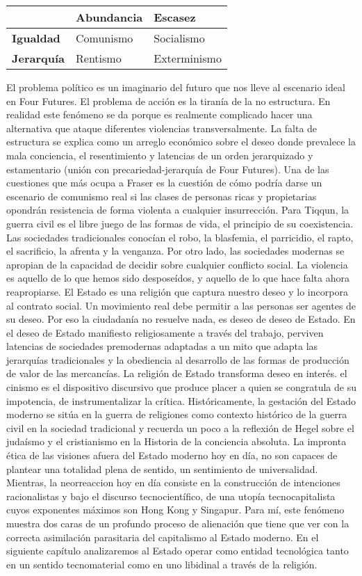 \documentclass[
]{article}
\begin{document}
\begin{longtable}[]{@{}lll@{}}
\toprule
& \textbf{Abundancia} & \textbf{Escasez}\tabularnewline
\midrule
\endhead
\textbf{Igualdad} & Comunismo & Socialismo\tabularnewline
\textbf{Jerarquía} & Rentismo & Exterminismo\tabularnewline
\bottomrule
\end{longtable}

El problema político es un imaginario del futuro que nos lleve al
escenario ideal en Four Futures. El problema de acción es la tiranía de
la no estructura. En realidad este fenómeno se da porque es realmente
complicado hacer una alternativa que ataque diferentes violencias
transversalmente. La falta de estructura se explica como un arreglo
económico sobre el deseo donde prevalece la mala conciencia, el
resentimiento y latencias de un orden jerarquizado y estamentario (unión
con precariedad-jerarquía de Four Futures). Una de las cuestiones que
más ocupa a Fraser es la cuestión de cómo podría darse un escenario de
comunismo real si las clases de personas ricas y propietarias opondrán
resistencia de forma violenta a cualquier insurrección. Para Tiqqun, la
guerra civil es el libre juego de las formas de vida, el principio de su
coexistencia. Las sociedades tradicionales conocían el robo, la
blasfemia, el parricidio, el rapto, el sacrificio, la afrenta y la
venganza. Por otro lado, las sociedades modernas se apropian de la
capacidad de decidir sobre cualquier conflicto social. La violencia es
aquello de lo que hemos sido desposeídos, y aquello de lo que hace falta
ahora reapropiarse. El Estado es una religión que captura nuestro deseo
y lo incorpora al contrato social. Un movimiento real debe permitir a
las personas ser agentes de su deseo. Por eso la ciudadanía no resuelve
nada, es deseo de deseo de Estado. En el deseo de Estado manifiesto
religiosamente a través del trabajo, perviven latencias de sociedades
premodernas adaptadas a un mito que adapta las jerarquías tradicionales
y la obediencia al desarrollo de las formas de producción de valor de
las mercancías. La religión de Estado transforma deseo en interés. el
cinismo es el dispositivo discursivo que produce placer a quien se
congratula de su impotencia, de instrumentalizar la crítica.
Históricamente, la gestación del Estado moderno se sitúa en la guerra de
religiones como contexto histórico de la guerra civil en la sociedad
tradicional y recuerda un poco a la reflexión de Hegel sobre el judaísmo
y el cristianismo en la Historia de la conciencia absoluta. La impronta
ética de las visiones afuera del Estado moderno hoy en día, no son
capaces de plantear una totalidad plena de sentido, un sentimiento de
universalidad. Mientras, la neorreaccion hoy en día consiste en la
construcción de intenciones racionalistas y bajo el discurso
tecnocientífico, de una utopía tecnocapitalista cuyos exponentes máximos
son Hong Kong y Singapur. Para mí, este fenómeno muestra dos caras de un
profundo proceso de alienación que tiene que ver con la correcta
asimilación parasitaria del capitalismo al Estado moderno. En el
siguiente capítulo analizaremos al Estado operar como entidad
tecnológica tanto en un sentido tecnomaterial como en uno libidinal a
través de la religión.
\end{document}
